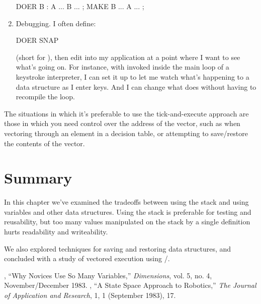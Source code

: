\begin{enumerate}
\begin{Code}
DOER B
: A  ... B ... ;
MAKE B  ... A ... ;
\end{Code}
\item Debugging. I often define:

\begin{Code}
DOER SNAP
\end{Code}
(short for ), then edit  into my
application at a point where I want to see what's going on. For
instance, with  invoked inside the main loop of a
keystroke interpreter, I can set it up to let me watch what's
happening to a data structure as I enter keys. And I can change what
 does without having to recompile the loop.
\end{enumerate}


The situations in which it's preferable to use the tick-and-execute
approach are those in which you need control over the address of the
vector, such as when vectoring through an element in a decision table, or
attempting to save/restore the contents of the vector.

\section{Summary}
In this chapter we've examined the tradeoffs between using the stack and
using variables and other data structures. Using the stack is preferable
for testing and reusability, but too many values manipulated on the stack
by a single definition hurts readability and writeability.

We also explored techniques for saving and restoring data structures,
and concluded with a study of vectored execution using
/.%

\begin{references}{9}
 , ``Why Novices Use So Many Variables,''
   \emph{\Forth{} Dimensions}, vol. 5, no. 4, November/December 1983.
 , ``A State Space Approach to
   Robotics,'' \emph{The Journal of \Forth{} Application and Research},
   1, 1 (September 1983), 17.
\end{references}

